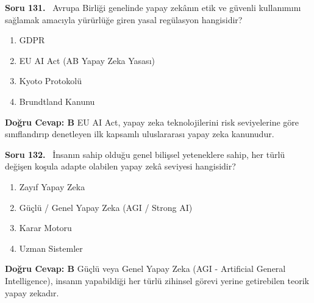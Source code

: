 \documentclass[11pt,a4paper,openany]{book}
\begin{document}
\needspace{5cm}
\vspace{8pt}
\noindent\textbf{\large\sffamily Soru 131.} \ Avrupa Birliği genelinde yapay zekânın etik ve güvenli kullanımını sağlamak amacıyla yürürlüğe giren yasal regülasyon hangisidir?
\begin{enumerate}[label=\Alph*), leftmargin=25pt, topsep=4pt, itemsep=2pt]
    \item GDPR
    \item EU AI Act (AB Yapay Zeka Yasası)
    \item Kyoto Protokolü
    \item Brundtland Kanunu
\end{enumerate}
\vspace{4pt}
\begin{tcolorbox}[title=Cevap ve Açıklama, colback=gray!3!white, colframe=primarycolor!90!black, arc=2mm, fonttitle=\bfseries\sffamily, top=6pt, bottom=6pt]
    \textbf{Doğru Cevap: B}
    \vspace{2pt}
    EU AI Act, yapay zeka teknolojilerini risk seviyelerine göre sınıflandırıp denetleyen ilk kapsamlı uluslararası yapay zeka kanunudur.
\end{tcolorbox}
\vspace{10pt}

\needspace{5cm}
\vspace{8pt}
\noindent\textbf{\large\sffamily Soru 132.} \ İnsanın sahip olduğu genel bilişsel yeteneklere sahip, her türlü değişen koşula adapte olabilen yapay zekâ seviyesi hangisidir?
\begin{enumerate}[label=\Alph*), leftmargin=25pt, topsep=4pt, itemsep=2pt]
    \item Zayıf Yapay Zeka
    \item Güçlü / Genel Yapay Zeka (AGI / Strong AI)
    \item Karar Motoru
    \item Uzman Sistemler
\end{enumerate}
\vspace{4pt}
\begin{tcolorbox}[title=Cevap ve Açıklama, colback=gray!3!white, colframe=primarycolor!90!black, arc=2mm, fonttitle=\bfseries\sffamily, top=6pt, bottom=6pt]
    \textbf{Doğru Cevap: B}
    \vspace{2pt}
    Güçlü veya Genel Yapay Zeka (AGI - Artificial General Intelligence), insanın yapabildiği her türlü zihinsel görevi yerine getirebilen teorik yapay zekadır.
\end{tcolorbox}
\vspace{10pt}
\end{document}
